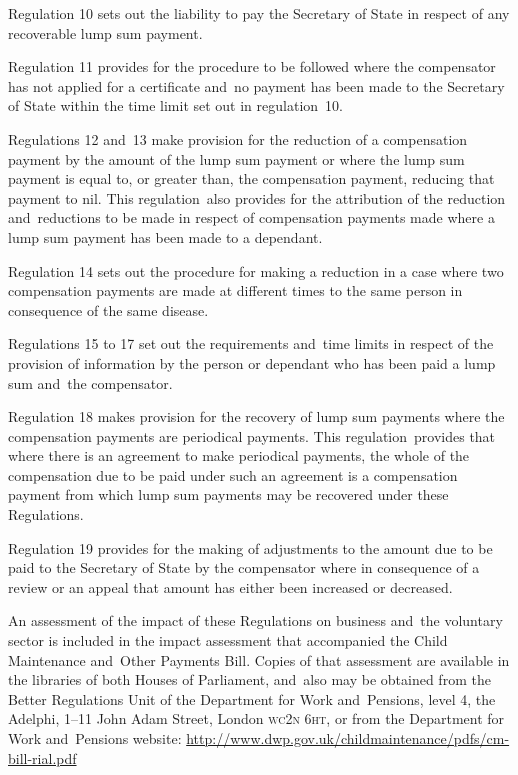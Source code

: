 \documentclass[12pt,a4paper]{article}
\begin{document}
Regulation 10 sets out the liability to pay the Secretary of State in respect of any recoverable lump sum payment.

Regulation 11 provides for the procedure to be followed where the compensator has not applied for a certificate and~no payment has been made to the Secretary of State within the time limit set out in regulation~10.

Regulations 12 and~13 make provision for the reduction of a compensation payment by the amount of the lump sum payment or where the lump sum payment is equal to, or greater than, the compensation payment, reducing that payment to nil. This regulation~also provides for the attribution of the reduction and~reductions to be made in respect of compensation payments made where a lump sum payment has been made to a dependant.

Regulation 14 sets out the procedure for making a reduction in a case where two compensation payments are made at different times to the same person in consequence of the same disease.

Regulations 15 to 17 set out the requirements and~time limits in respect of the provision of information by the person or dependant who has been paid a lump sum and~the compensator.

Regulation 18 makes provision for the recovery of lump sum payments where the compensation payments are periodical payments. This regulation~provides that where there is an agreement to make periodical payments, the whole of the compensation due to be paid under such an agreement is a compensation payment from which lump sum payments may be recovered under these Regulations.

Regulation 19 provides for the making of adjustments to the amount due to be paid to the Secretary of State by the compensator where in consequence of a review or an appeal that amount has either been increased or decreased.

An assessment of the impact of these Regulations on business and~the voluntary sector is included in the impact assessment that accompanied the Child Maintenance and~Other Payments Bill. Copies of that assessment are available in the libraries of both Houses of Parliament, and~also may be obtained from the Better Regulations Unit of the Department for Work and~Pensions, level 4, the Adelphi, 1--11 John Adam Street, London \textsc{\lowercase{WC2N 6HT}}, or from the Department for Work and~Pensions website: \url{http://www.dwp.gov.uk/childmaintenance/pdfs/cm-bill-rial.pdf}
\end{document}
